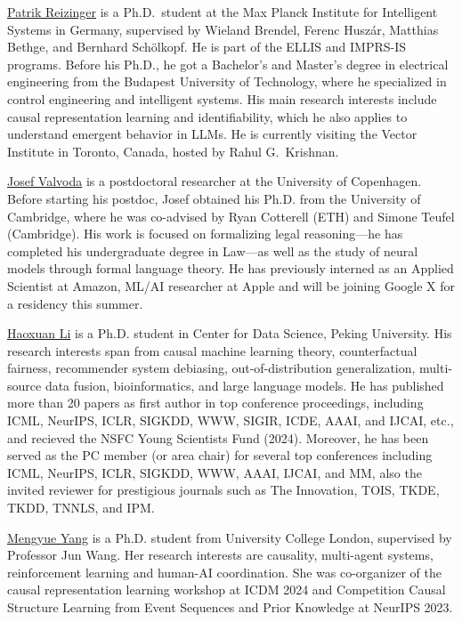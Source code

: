 \documentclass{article}
\begin{document}
\href{https://rpatrik96.github.io/}{Patrik Reizinger} is a Ph.D.\ student at the Max Planck Institute for Intelligent Systems in Germany, supervised by Wieland Brendel, Ferenc Huszár, Matthias Bethge, and Bernhard Schölkopf. He is part of the ELLIS and IMPRS-IS programs. Before his Ph.D., he got a Bachelor's and Master's degree in electrical engineering from the Budapest University of Technology, where he specialized in control engineering and intelligent systems. His main research interests include causal representation learning and identifiability, which he also applies to understand emergent behavior in LLMs. He is currently visiting the Vector Institute in Toronto, Canada, hosted by Rahul G.~Krishnan.

\href{https://valvoda.github.io/}{Josef Valvoda} is a postdoctoral researcher at the University of Copenhagen. 
Before starting his postdoc, Josef obtained his Ph.D. from the University of Cambridge, where he was co-advised by Ryan Cotterell (ETH) and Simone Teufel (Cambridge).
His work is focused on formalizing legal reasoning---he has completed his undergraduate degree in Law---as well as the study of neural models through formal language theory.
He has previously interned as an Applied Scientist at Amazon, ML/AI researcher at Apple and will be joining Google X for a residency this summer.

\href{https://scholar.google.com/citations?user=gtDqiucAAAAJ&hl=en}{Haoxuan Li} is a Ph.D. student in Center for Data Science, Peking University. His research interests span from causal machine learning theory, counterfactual fairness, recommender system debiasing, out-of-distribution generalization, multi-source data fusion, bioinformatics, and large language models. He has published more than 20 papers as first author in top conference
proceedings, including ICML, NeurIPS, ICLR, SIGKDD, WWW, SIGIR, ICDE, AAAI, and IJCAI, etc., and recieved the NSFC Young Scientists Fund (2024). Moreover, he has been served as the PC member (or area chair) for several top conferences including ICML, NeurIPS, ICLR, SIGKDD, WWW, AAAI, IJCAI, and MM, also the invited reviewer for prestigious journals such as The Innovation, TOIS, TKDE, TKDD, TNNLS, and IPM.

\href{https://ymy4323460.github.io/}{Mengyue Yang} is a Ph.D. student from University College London, supervised by Professor Jun Wang. Her research interests are causality, multi-agent systems, reinforcement learning and human-AI coordination. She was co-organizer of the causal representation learning workshop at ICDM 2024 and Competition Causal Structure Learning from Event Sequences and Prior Knowledge at NeurIPS 2023.
\end{document}
